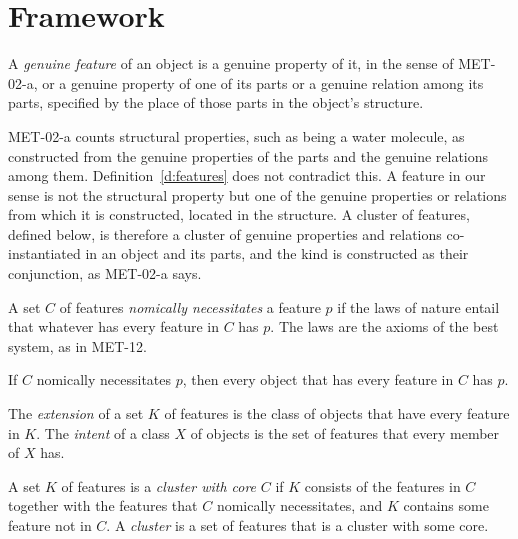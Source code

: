 \documentclass{situationist-preprint}
\begin{document}
\section{Framework}\label{s:framework}

\begin{definition}[Features]\label{d:features}
A \emph{genuine feature} of an object is a genuine property of it, in the sense of MET-02-a, or a genuine property of one of its parts or a genuine relation among its parts, specified by the place of those parts in the object's structure.
\end{definition}

MET-02-a counts structural properties, such as being a water molecule, as constructed from the genuine properties of the parts and the genuine relations among them. Definition~\ref{d:features} does not contradict this. A feature in our sense is not the structural property but one of the genuine properties or relations from which it is constructed, located in the structure. A cluster of features, defined below, is therefore a cluster of genuine properties and relations co-instantiated in an object and its parts, and the kind is constructed as their conjunction, as MET-02-a says.

\begin{definition}[Laws]\label{d:laws}
A set $C$ of features \emph{nomically necessitates} a feature $p$ if the laws of nature entail that whatever has every feature in $C$ has $p$. The laws are the axioms of the best system, as in MET-12.
\end{definition}

\begin{assumption}\label{a:true}
If $C$ nomically necessitates $p$, then every object that has every feature in $C$ has $p$.
\end{assumption}

\begin{definition}\label{d:extint}
The \emph{extension} of a set $K$ of features is the class of objects that have every feature in $K$. The \emph{intent} of a class $X$ of objects is the set of features that every member of $X$ has.
\end{definition}

\begin{definition}[Cluster]\label{d:cluster}
A set $K$ of features is a \emph{cluster with core} $C$ if $K$ consists of the features in $C$ together with the features that $C$ nomically necessitates, and $K$ contains some feature not in $C$. A \emph{cluster} is a set of features that is a cluster with some core.
\end{definition}
\end{document}
